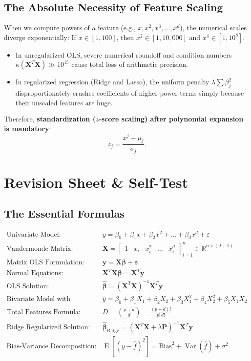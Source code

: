\documentclass[11pt,a4paper]{article}
\numberwithin{equation}{section}
\newcommand{\RR}{\mathbb{R}}
\newcommand{\E}{\operatorname{E}}
\newcommand{\Var}{\operatorname{Var}}
\newcommand{\X}{\mathbf{X}}
\newcommand{\y}{\mathbf{y}}
\newcommand{\bta}{\boldsymbol{\beta}}
\newcommand{\bhat}{\widehat{\boldsymbol{\beta}}}
\newcommand{\eps}{\boldsymbol{\varepsilon}}
\begin{document}
\subsection{The Absolute Necessity of Feature Scaling}
When we compute powers of a feature (e.g., $x, x^2, x^3, \dots, x^d$), the numerical scales diverge exponentially:
If $x \in [1, 100]$, then $x^2 \in [1, 10{,}000]$ and $x^4 \in [1, 10^8]$. 
\begin{itemize}
  \item In unregularized OLS, severe numerical roundoff and condition numbers $\kappa(\X^T\X) \gg 10^{15}$ cause total loss of arithmetic precision.
  \item In regularized regression (Ridge and Lasso), the uniform penalty $\lambda \sum \beta_j^2$ disproportionately crushes coefficients of higher-power terms simply because their unscaled features are huge.
\end{itemize}
Therefore, \textbf{standardization ($z$-score scaling) after polynomial expansion is mandatory}:
\begin{equation}
  z_j = \frac{x^j - \mu_j}{\sigma_j}.
\end{equation}


\section{Revision Sheet \& Self-Test}

\subsection{The Essential Formulas}
\begin{align*}
  \text{Univariate Model:}\quad& y = \beta_0 + \beta_1 x + \beta_2 x^2 + \dots + \beta_d x^d + \varepsilon \\
  \text{Vandermonde Matrix:}\quad& \X = \begin{bmatrix} 1 & x_i & x_i^2 & \dots & x_i^d \end{bmatrix}_{i=1}^n \in \RR^{n \times (d+1)} \\
  \text{Matrix OLS Formulation:}\quad& \y = \X\bta + \eps \\
  \text{Normal Equations:}\quad& \X^T\X\bta = \X^T\y \\
  \text{OLS Solution:}\quad& \bhat = (\X^T\X)^{-1}\X^T\y \\
  \text{Bivariate Model with Interaction:}\quad& \hat{y} = \beta_0 + \beta_1 X_1 + \beta_2 X_2 + \beta_3 X_1^2 + \beta_4 X_2^2 + \beta_5 X_1 X_2 \\
  \text{Total Features Formula:}\quad& D = \binom{p + d}{d} = \frac{(p+d)!}{p! \, d!} \\
  \text{Ridge Regularized Solution:}\quad& \bhat_{\text{Ridge}} = (\X^T\X + \lambda \mathbf{P})^{-1}\X^T\y \\
  \text{Bias-Variance Decomposition:}\quad& \E[(y - \hat{f})^2] = \text{Bias}^2 + \Var(\hat{f}) + \sigma^2
\end{align*}
\end{document}
